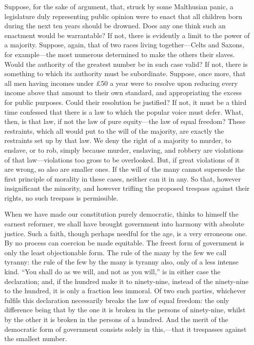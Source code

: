 \documentclass[oneside]{book}
\begin{document}
Suppose, for the sake of argument, that, struck by some
Malthusian panic, a legislature duly representing public opinion
were to enact that all children born during the next ten years
should be drowned. Does any one think such an enactment
would be warrantable? If not, there is evidently a limit to the
power of a majority. Suppose, again, that of two races living
together---Celts and Saxons, for example---the most numerous
determined to make the others their slaves. Would the authority
of the greatest number be in such case valid? If not, there is
something to which its authority must be subordinate. Suppose,
once more, that all men having incomes under \pounds{}50 a year were
to resolve upon reducing every income above that amount to
their own standard, and appropriating the excess for public
purposes. Could their resolution be justified? If not, it must
be a third time confessed that there is a law to which the
popular voice must defer. What, then, is that law, if not the
law of pure equity---the law of equal freedom? These restraints,
which all would put to the will of the majority, are exactly the
restraints set up by that law. We deny the right of a majority
to murder, to enslave, or to rob, simply because murder,
enslaving, and robbery are violations of that law---violations
too gross to be overlooked. But, if great violations of it are
wrong, so also are smaller ones. If the will of the many cannot
supersede the first principle of morality in these cases, neither
can it in any. So that, however insignificant the minority, and
\newpage\noindent
however trifling the proposed trespass against their rights, no
such trespass is permissible.

When we have made our constitution purely democratic,
thinks to himself the earnest reformer, we shall have brought
government into harmony with absolute justice. Such a faith,
though perhaps needful for the age, is a very erroneous one. By
no process can coercion be made equitable. The freest form of
government is only the least objectionable form. The rule of the
many by the few we call tyranny: the rule of the few by the
many is tyranny also, only of a less intense kind. ``You shall
do as we will, and not as you will,'' is in either case the declaration;
and, if the hundred make it to ninety-nine, instead of the
ninety-nine to the hundred, it is only a fraction less immoral.
Of two such parties, whichever fulfils this declaration necessarily
breaks the law of equal freedom: the only difference being that
by the one it is broken in the persons of ninety-nine, whilst by
the other it is broken in the persons of a hundred. And the
merit of the democratic form of government consists solely in
this,---that it trespasses against the smallest number.
\end{document}
